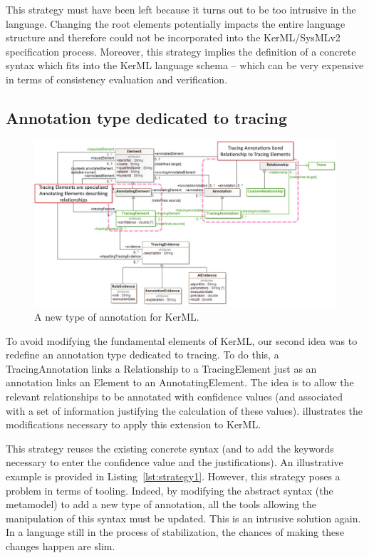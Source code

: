 This strategy must have been left because it turns out to be too intrusive in the language. Changing the root elements potentially impacts the entire language structure and therefore could not be incorporated into the KerML/SysMLv2 specification process. Moreover, this strategy implies the definition of a concrete syntax which fits into the {KerML} language schema -- which can be very expensive in terms of consistency evaluation and verification.

\subsection{Annotation type dedicated to tracing}
\begin{figure}[ht]     
	\centering
	\includegraphics[width=.99\linewidth]{images/strategy2-annotation.jpg}
	\caption{A new type of annotation for {KerML}.}
	\label{fig:strategy2}
\end{figure}
To avoid modifying the fundamental elements of {KerML}, our second idea was to redefine an annotation type dedicated to tracing. To do this, a TracingAnnotation links a Relationship to a TracingElement just as an annotation links an Element to an AnnotatingElement. The idea is to allow the relevant relationships to be annotated with confidence values (and associated with a set of information justifying the calculation of these values).  illustrates the modifications necessary to apply this extension to {KerML}.

This strategy reuses the existing concrete syntax (and to add the keywords necessary to enter the confidence value and the justifications). An illustrative example is provided in Listing~\ref{lst:strategy1}.
However, this strategy poses a problem {in terms of tooling}. Indeed, by modifying the abstract syntax (the metamodel) to add a new type of annotation, all the tools allowing the manipulation of this syntax must be updated.
{This is an intrusive solution again. In a language still in the process of stabilization, the chances of making these changes happen are slim.}


